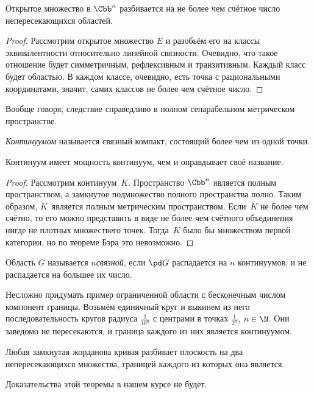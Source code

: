 \documentclass[a4paper]{article}
\begin{document}
\begin{theorem}
Открытое множество в $\Cbb^n$ разбивается на не более чем счётное число непересекающихся областей.
\end{theorem}
\begin{proof}
Рассмотрим открытое множество $E$ и разобьём его на классы эквивалентности относительно линейной связности.
Очевидно, что такое отношение будет симметричным, рефлексивным и транзитивным. Каждый класс будет областью.
В каждом классе, очевидно, есть точка с рациональными координатами, значит, самих классов не более чем
счётное число.
\end{proof}

\begin{note}
Вообще говоря, следствие справедливо в полном сепарабельном метрическом пространстве.
\end{note}

\begin{df}
\emph{Континуумом} называется связный компакт, состоящий более чем из одной точки.
\end{df}

\begin{stm}
Континуум имеет мощность континуум, чем и оправдывает своё название.
\end{stm}
\begin{proof}
Рассмотрим континуум~$K$. Пространство $\Cbb^n$ является полным пространством,
а замкнутое подмножество полного пространства полно. Таким образом, $K$~является
полным метрическим пространством. Если~$K$ не более чем счётно, то его
можно представить в виде не более чем счётного объединения нигде не плотных множеств\т его точек.
Тогда~$K$ было бы множеством первой категории, но по теореме Бэра это невозможно.
\end{proof}

\begin{df}
Область $G$ называется \emph{$n$\д связной}, если $\pd G$ распадается на $n$ континуумов, и не распадается на
большее их число.
\end{df}

Несложно придумать пример ограниченной области с бесконечным числом компонент границы. Возьмём единичный
круг и выкинем из него последовательность кругов радиуса $\frac{1}{10^n}$ с центрами в точках $\frac{1}{2^n}$, $n\in\N$.
Они заведомо не пересекаются, и граница каждого из них является континуумом.

\begin{theorem}[Жордана]
Любая замкнутая жорданова кривая разбивает плоскость на два непересекающихся множества, границей каждого
из которых она является.
\end{theorem}
Доказательства этой теоремы в нашем курсе не будет.
\end{document}
